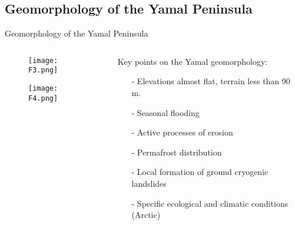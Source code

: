 \documentclass[pdflatex,compress,9pt,
	xcolor={dvipsnames,dvipsnames,svgnames,x11names,table},
	hyperref={colorlinks = true,breaklinks = true, urlcolor = NavyBlue, breaklinks = true}]{beamer}
\begin{document}
\subsection{Geomorphology of the Yamal Peninsula}
\begin{frame}{Geomorphology of the Yamal Peninsula}

\begin{minipage}[0.4\textheight]{\textwidth}
\begin{columns}[T]
\begin{column}{0.5\textwidth}
\begin{figure}[H]
	\centering
		\texttt{[image: F3.png]}
\end{figure}
\begin{figure}[H]
	\centering
		\texttt{[image: F4.png]}
\end{figure}
\end{column}
\begin{column}{0.5\textwidth}
\vspace{2em}
	Key points on the Yamal geomorphology: 
\begin{itemize}
       \item[-] Elevations almost flat, terrain less than 90 m.
       \item[-] Seasonal flooding
       \item[-] Active processes of erosion
       \item[-] Permafrost distribution
       \item[-] Local formation of ground cryogenic landslides
       \item[-] Specific ecological and climatic conditions (Arctic)
\end{itemize}
\end{column}
\end{columns}
\end{minipage}
\end{frame}
\end{document}
